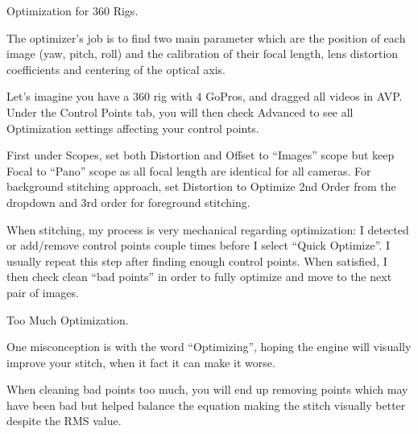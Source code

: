 \begin{fullwidth}
\clearpage
{\large Optimization for 360 Rigs. \par}

The optimizer’s job is to find two main parameter which are the position of each image (yaw, pitch, roll) and the calibration of their focal length, lens distortion coefficients and centering of the optical axis. 


Let’s imagine you have a 360 rig with 4 GoPros, and dragged all videos in AVP. Under the Control Points tab, you will then check Advanced to see all Optimization settings affecting your control points.


First under Scopes, set both Distortion and Offset to “Images” scope but keep Focal to “Pano” scope as all focal length are identical for all cameras. For background stitching approach, set Distortion to Optimize 2nd Order from the dropdown and 3rd order for foreground stitching.


When stitching, my process is very mechanical regarding optimization: I detected or add/remove control points couple times before I select “Quick Optimize”. I usually repeat this step after finding enough control points. When satisfied, I then check clean “bad points” in order to fully optimize and move to the next pair of images.


{\large Too Much Optimization. \par}

One misconception is with the word “Optimizing”, hoping the engine will visually improve your stitch, when it fact it can make it worse.

When cleaning bad points too much, you will end up removing points which may have been bad but helped balance the equation making the stitch visually better despite the RMS value.


\clearpage
\end{fullwidth}
